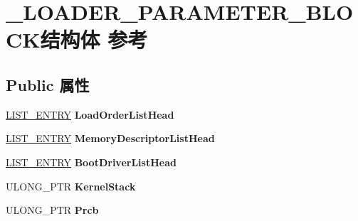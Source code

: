 \hypertarget{struct___l_o_a_d_e_r___p_a_r_a_m_e_t_e_r___b_l_o_c_k}{}\section{\+\_\+\+L\+O\+A\+D\+E\+R\+\_\+\+P\+A\+R\+A\+M\+E\+T\+E\+R\+\_\+\+B\+L\+O\+C\+K结构体 参考}
\label{struct___l_o_a_d_e_r___p_a_r_a_m_e_t_e_r___b_l_o_c_k}
\subsection*{Public 属性}
\begin{DoxyCompactItemize}
\item 
\mbox{\label{struct___l_o_a_d_e_r___p_a_r_a_m_e_t_e_r___b_l_o_c_k_a623b26c4210067111bd27f552243adba}} 
\hyperlink{struct___l_i_s_t___e_n_t_r_y}{L\+I\+S\+T\+\_\+\+E\+N\+T\+RY} {\bfseries Load\+Order\+List\+Head}
\item 
\mbox{\label{struct___l_o_a_d_e_r___p_a_r_a_m_e_t_e_r___b_l_o_c_k_ade1a9f1aa82a1cc84fcc161b7dab342d}} 
\hyperlink{struct___l_i_s_t___e_n_t_r_y}{L\+I\+S\+T\+\_\+\+E\+N\+T\+RY} {\bfseries Memory\+Descriptor\+List\+Head}
\item 
\mbox{\label{struct___l_o_a_d_e_r___p_a_r_a_m_e_t_e_r___b_l_o_c_k_a07be85fd15367882127cbde3d560b6f6}} 
\hyperlink{struct___l_i_s_t___e_n_t_r_y}{L\+I\+S\+T\+\_\+\+E\+N\+T\+RY} {\bfseries Boot\+Driver\+List\+Head}
\item 
\mbox{\label{struct___l_o_a_d_e_r___p_a_r_a_m_e_t_e_r___b_l_o_c_k_a635a3bdb581122d94ed67209c8a9c264}} 
U\+L\+O\+N\+G\+\_\+\+P\+TR {\bfseries Kernel\+Stack}
\item 
\mbox{\label{struct___l_o_a_d_e_r___p_a_r_a_m_e_t_e_r___b_l_o_c_k_a95d2d46a9719d1893ed60f19facf5154}} 
U\+L\+O\+N\+G\+\_\+\+P\+TR {\bfseries Prcb}
\item 
\mbox{\label{struct___l_o_a_d_e_r___p_a_r_a_m_e_t_e_r___b_l_o_c_k_ac0510ee32cb7765c696a257eabed19f3}} 

\end{DoxyCompactItemize}
